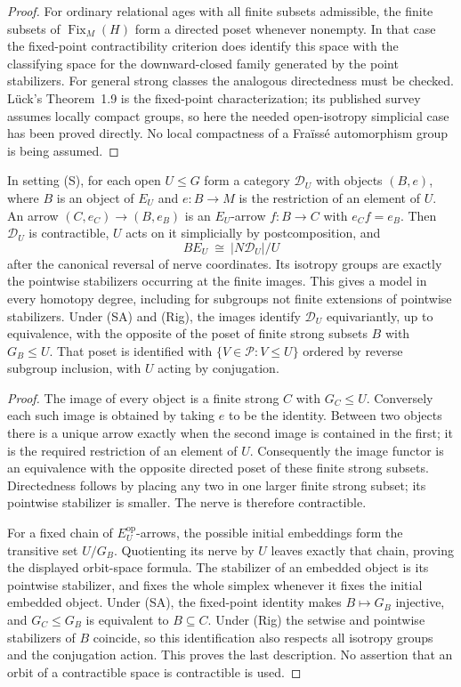 \begin{proof}
For ordinary relational ages with all finite subsets admissible,
the finite subsets of $\operatorname{Fix}_M(H)$ form a directed
poset whenever nonempty. In that case the fixed-point
contractibility criterion does identify this space with the
classifying space for the downward-closed family generated by
the point stabilizers. For general strong classes the analogous
directedness must be checked. L\"uck's Theorem~1.9 is the
fixed-point characterization; its published survey assumes
locally compact groups, so here the needed open-isotropy
simplicial case has been proved directly. No local compactness
of a Fra\"iss\'e automorphism group is being assumed.
\end{proof}

\begin{proposition}
\label{B:orbit-model}
In setting (S), for each open $U\leq G$ form a category
$\mathcal D_U$ with objects $(B,e)$, where $B$ is an object of
$E_U$ and $e:B\to M$ is the restriction of an element of $U$.
An arrow $(C,e_C)\to(B,e_B)$ is an $E_U$-arrow $f:B\to C$
with $e_Cf=e_B$. Then $\mathcal D_U$ is contractible,
$U$ acts on it simplicially by postcomposition, and
\[
 BE_U\ \cong\ |N\mathcal D_U|/U
\]
after the canonical reversal of nerve coordinates. Its isotropy
groups are exactly the pointwise stabilizers occurring at the
finite images. This gives a model in every homotopy degree,
including for subgroups not finite extensions of pointwise
stabilizers. Under (SA) and (Rig), the images identify
$\mathcal D_U$ equivariantly, up to equivalence, with the
opposite of the poset of finite strong subsets $B$ with
$G_B\leq U$. That poset is identified with
$\{V\in\mathcal P:V\leq U\}$ ordered by reverse subgroup
inclusion, with $U$ acting by conjugation.
\end{proposition}
\begin{proof}
The image of every object is a finite strong $C$ with
$G_C\leq U$. Conversely each such image is obtained by taking
$e$ to be the identity. Between two objects there is a unique
arrow exactly when the second image is contained in the first;
it is the required restriction of an element of $U$.
Consequently the image functor is an equivalence with the
opposite directed poset of these finite strong subsets.
Directedness follows by placing any two in one larger finite
strong subset; its pointwise stabilizer is smaller. The nerve
is therefore contractible.

For a fixed chain of $E_U^{\mathrm{op}}$-arrows, the possible
initial embeddings form the transitive set $U/G_B$.
Quotienting its nerve by $U$ leaves exactly that chain, proving
the displayed orbit-space formula. The stabilizer of an
embedded object is its pointwise stabilizer, and fixes the
whole simplex whenever it fixes the initial embedded object.
Under (SA), the fixed-point identity makes
$B\mapsto G_B$ injective, and $G_C\leq G_B$ is equivalent to
$B\subseteq C$. Under (Rig) the setwise and pointwise
stabilizers of $B$ coincide, so this identification also respects
all isotropy groups and the conjugation action. This proves
the last description. No assertion that an orbit of a
contractible space is contractible is used.
\end{proof}

